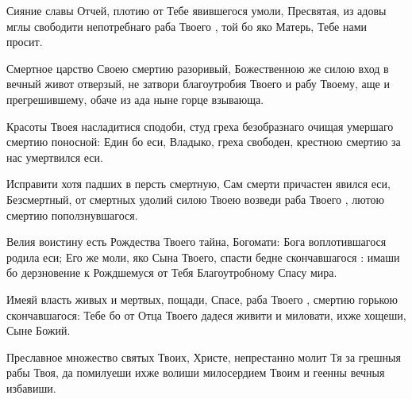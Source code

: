 \begin{mymulticols}
\inyne


Сияние славы Отчей, плотию от Тебе явившегося умоли, Пресвятая, из адовы мглы свободити непотребнаго раба Твоего , той бо яко Матерь, Тебе нами просит. 







Смертное царство Своею смертию разоривый, Божественною же силою вход в вечный живот отверзый, не затвори благоутробия Твоего и рабу Твоему, аще и прегрешившему, обаче из ада ныне горце взывающа.




Красоты Твоея насладитися сподоби, студ греха безобразнаго очищая умершаго смертию поносной: Един бо еси, Владыко, греха свободен, крестною смертию за нас умертвился еси.


\slava


Исправити хотя падших в персть смертную, Сам смерти причастен явился еси, Безсмертный, от смертных удолий силою Твоею возведи раба Твоего , лютою смертию поползнувшагося.


\inyne


Велия воистину есть Рождества Твоего тайна, Богомати: Бога воплотившагося родила еси; Его же моли, яко Сына Твоего, спасти бедне скончавшагося : имаши бо дерзновение к Рождшемуся от Тебя Благоутробному Спасу мира. 







Имеяй власть живых и мертвых, пощади, Спасе, раба Твоего , смертию горькою скончавшагося: Тебе бо от Отца Твоего дадеся живити и миловати, ихже хощеши, Сыне Божий.



Преславное множество святых Твоих, Христе, непрестанно молит Тя за грешныя рабы Твоя, да помилуеши ихже волиши милосердием Твоим и геенны вечныя избавиши.
\end{mymulticols}

